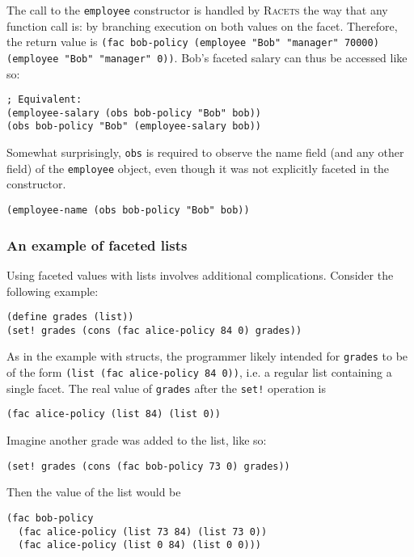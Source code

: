 \documentclass{article}
\begin{document}
The call to the \texttt{employee} constructor is handled by \textsc{Racets} the way that any function call is: by branching execution on both values on the facet. Therefore, the return value is \texttt{(fac bob-policy (employee "Bob" "manager" 70000) (employee "Bob" "manager" 0))}. Bob's faceted salary can thus be accessed like so:

\begin{lstlisting}
; Equivalent:
(employee-salary (obs bob-policy "Bob" bob))
(obs bob-policy "Bob" (employee-salary bob))
\end{lstlisting}

Somewhat surprisingly, \texttt{obs} is required to observe the name field (and any other field) of the \texttt{employee} object, even though it was not explicitly faceted in the constructor.

\begin{lstlisting}
(employee-name (obs bob-policy "Bob" bob))
\end{lstlisting}

\subsubsection{An example of faceted lists}
Using faceted values with lists involves additional complications. Consider the following example:

\begin{lstlisting}
(define grades (list))
(set! grades (cons (fac alice-policy 84 0) grades))
\end{lstlisting}

As in the example with structs, the programmer likely intended for \texttt{grades} to be of the form \texttt{(list (fac alice-policy 84 0))}, i.e. a regular list containing a single facet. The real value of \texttt{grades} after the \texttt{set!} operation is

\begin{lstlisting}
(fac alice-policy (list 84) (list 0))
\end{lstlisting}

Imagine another grade was added to the list, like so:

\begin{lstlisting}
(set! grades (cons (fac bob-policy 73 0) grades))
\end{lstlisting}

Then the value of the list would be

\begin{lstlisting}
(fac bob-policy
  (fac alice-policy (list 73 84) (list 73 0))
  (fac alice-policy (list 0 84) (list 0 0)))
\end{lstlisting}
\end{document}
